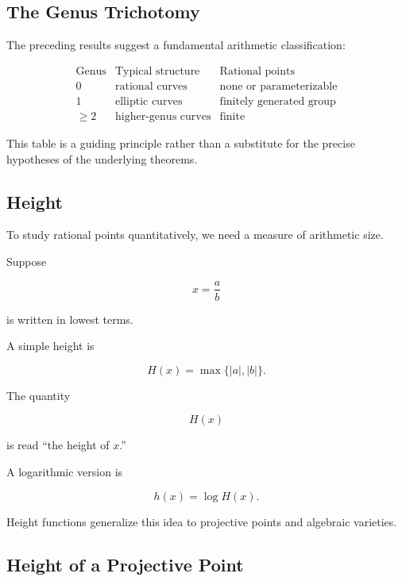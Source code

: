 \subsection{The Genus Trichotomy}
\label{subsec:genus-trichotomy}

The preceding results suggest a fundamental arithmetic classification:

\[
\boxed{
\begin{array}{c|c|c}
\text{Genus} & \text{Typical structure} & \text{Rational points}\\
\hline
0 & \text{rational curves} & \text{none or parameterizable}\\
1 & \text{elliptic curves} & \text{finitely generated group}\\
\geq2 & \text{higher-genus curves} & \text{finite}
\end{array}
}
\]

This table is a guiding principle rather than a substitute for the precise
hypotheses of the underlying theorems.

\subsection{Height}
\label{subsec:height-diophantine-geometry}

To study rational points quantitatively, we need a measure of arithmetic
size.

Suppose

\[ x=\frac ab \]

is written in lowest terms.

A simple height is

\[ H(x)=\max\{|a|,|b|\}. \]

The quantity

\[ H(x) \]

is read ``the height of \(x\).''

A logarithmic version is

\[ h(x)=\log H(x). \]

Height functions generalize this idea to projective points and algebraic
varieties.

\subsection{Height of a Projective Point}
\label{subsec:projective-height}

